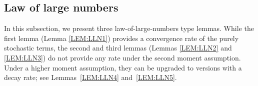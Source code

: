 \documentclass[letterpaper, 11pt,  reqno]{amsart}
\newcommand{\1}{\hspace{0.5mm}\text{I}\hspace{0.2mm}}
\numberwithin{equation}{section}
\numberwithin{theorem}{section}
\begin{document}
\subsection{Law of large numbers} 
\label{SUBSEC:5.1}



In this subsection, we present three 
 law-of-large-numbers type lemmas.
While the first lemma (Lemma \ref{LEM:LLN1})
provides a convergence rate of the purely stochastic terms,
the second and third
lemmas (Lemmas \ref{LEM:LLN2} and \ref{LEM:LLN3})
do not provide any rate
under the second moment assumption.
Under a higher moment assumption, 
they can be upgraded
to versions with a decay rate;
see Lemmas~\ref{LEM:LLN4} and~\ref{LEM:LLN5}.
\end{document}
